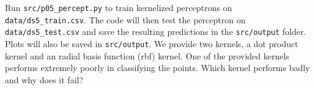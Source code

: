 \item {} Run \texttt{src/p05\_percept.py} to train
kernelized perceptrons on \texttt{data/ds5\_train.csv}. The code will then test
the perceptron on \texttt{data/ds5\_test.csv} and save the resulting
predictions in the \texttt{src/output} folder. Plots will also be saved in
\texttt{src/output}.  We provide two kernels, a dot product kernel and an
radial basis function (rbf) kernel. One of the provided kernels performs
extremely poorly in classifying the points. Which kernel performs badly and why
does it fail?

\ifnum{} {
  
} \fi
